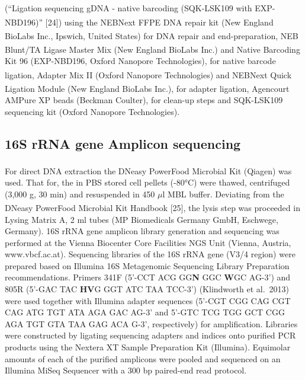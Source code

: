 \documentclass[preprint,3p,
a4paper]{elsarticle} %
\begin{document}
(``Ligation sequencing gDNA - native barcoding (SQK-LSK109 with
EXP-NBD196)'' {[}24{]}) using the
NEBNext\textsuperscript{\textregistered} FFPE DNA repair kit (New
England BioLabs\textsuperscript{\textregistered} Inc., Ipswich, United
States) for DNA repair and end-preparation, NEB Blunt/TA Ligase Master
Mix (New England BioLabs\textsuperscript{\textregistered} Inc.) and
Native Barcoding Kit 96 (EXP-NBD196, Oxford Nanopore Technologies), for
native barcode ligation, Adapter Mix II (Oxford Nanopore Technologies)
and NEBNext\textsuperscript{\textregistered} Quick Ligation Module (New
England BioLabs\textsuperscript{\textregistered} Inc.), for adapter
ligation, Agencourt AMPure XP beads (Beckman Coulter\texttrademark), for
clean-up steps and SQK-LSK109 sequencing kit (Oxford Nanopore
Technologies).

\hypertarget{s-rrna-gene-amplicon-sequencing}{%
\subsection{16S rRNA gene Amplicon
sequencing}\label{s-rrna-gene-amplicon-sequencing}}

For direct DNA extraction the DNeasy\textsuperscript{\textregistered}
PowerFood\textsuperscript{\textregistered} Microbial Kit (Qiagen) was
used. That for, the in PBS stored cell pellets (-80°C) were thawed,
centrifuged (3,000 g, 30 min) and resuspended in 450 \(\mu\)l MBL
buffer. Deviating from the DNeasy\textsuperscript{\textregistered}
PowerFood\textsuperscript{\textregistered} Microbial Kit Handbook
{[}25{]}, the lysis step was proceeded in Lysing Matrix A, 2 ml tubes
(MP Biomedicals Germany GmbH, Eschwege, Germany). 16S rRNA gene amplicon
library generation and sequencing was performed at the Vienna Biocenter
Core Facilities NGS Unit (Vienna, Austria, www.vbcf.ac.at). Sequencing
libraries of the 16S rRNA gene (V3/4 region) were prepared based on
Illumina 16S Metagenomic Sequencing Library Preparation recommendations.
Primers 341F (5'-CCT ACG GG\textbf{N} GGC \textbf{W}GC AG-3') and 805R
(5'-GAC TAC \textbf{HV}G GGT ATC TAA TCC-3') (Klindworth et al.~2013)
were used together with Illumina adapter sequences (5'-CGT CGG CAG CGT
CAG ATG TGT ATA AGA GAC AG-3' and 5'-GTC TCG TGG GCT CGG AGA TGT GTA TAA
GAG ACA G-3', respectively) for amplification. Libraries were
constructed by ligating sequencing adapters and indices onto purified
PCR products using the Nextera XT Sample Preparation Kit (Illumina).
Equimolar amounts of each of the purified amplicons were pooled and
sequenced on an Illumina MiSeq Sequencer with a 300 bp paired-end read
protocol.
\end{document}
